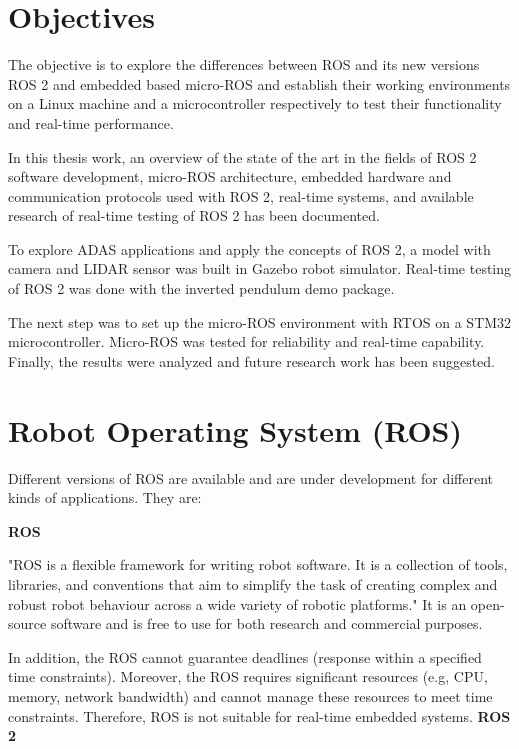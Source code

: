 \documentclass[%
xelatex,
	oneside,		%
	12pt,			%
	parskip=half,	%
	abstracton,
	chapterprefix=true%
    appendixprefix=true]
{scrbook}
\begin{document}
	 \section{Objectives}
The objective is to explore the differences between ROS and its new versions ROS 2 and embedded based micro-ROS and establish their working environments on a Linux machine and a microcontroller respectively to test their functionality and real-time performance.


In this thesis work, an overview of the state of the art in the fields of ROS 2 software development, micro-ROS architecture, embedded hardware and communication protocols used with ROS 2, real-time systems, and available research of real-time testing of ROS 2 has been documented. 

To explore ADAS applications and apply the concepts of ROS 2, a model with camera and LIDAR sensor was built in Gazebo robot simulator. Real-time testing of ROS 2 was done with the inverted pendulum demo package. 

The next step was to set up the micro-ROS environment with RTOS on a STM32 microcontroller. Micro-ROS was tested for reliability and real-time capability. Finally, the results were analyzed and future research work has been suggested.

	 \section{Robot Operating System (ROS)}
	 
Different versions of ROS are available and are under development for different kinds of applications. They are:

	 
	 {\bfseries ROS}
	 
"ROS is a flexible framework for writing robot software. It is a collection of tools, libraries, and conventions that aim to simplify the task of creating complex and robust robot behaviour across a wide variety of robotic platforms." \cite{ROS}	
It is an open-source software and is free to use for both research and commercial purposes.
 
In addition, the ROS cannot guarantee deadlines (response within a specified time constraints). Moreover, the ROS requires significant resources (e.g, CPU, memory, network bandwidth) and cannot manage these resources to meet time constraints. Therefore, ROS is not suitable for real-time embedded systems.\cite{rosvsros2}
\clearpage
{\bfseries	 ROS 2}
\end{document}
